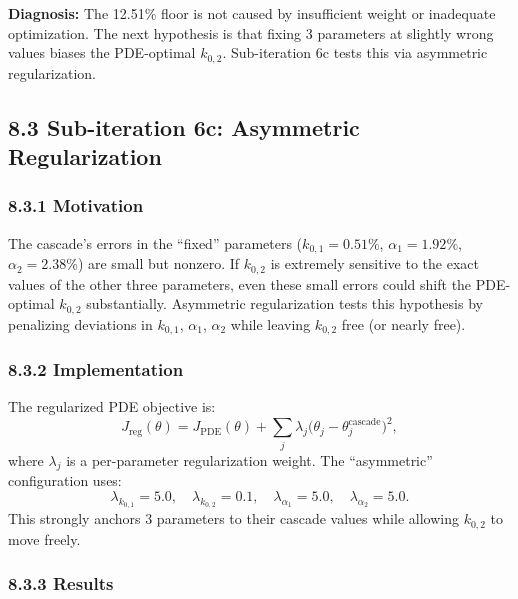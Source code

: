 \documentclass[11pt]{article}
\begin{document}
\textbf{Diagnosis:} The 12.51\% floor is not caused by insufficient weight
or inadequate optimization.  The next hypothesis is that fixing 3 parameters
at slightly wrong values biases the PDE-optimal $k_{0,2}$.  Sub-iteration
6c tests this via asymmetric regularization.

\subsection*{8.3 Sub-iteration 6c: Asymmetric Regularization}

\subsubsection*{8.3.1 Motivation}

The cascade's errors in the ``fixed'' parameters ($k_{0,1} = 0.51\%$,
$\alpha_1 = 1.92\%$, $\alpha_2 = 2.38\%$) are small but nonzero.
If $k_{0,2}$ is extremely sensitive to the exact values of the other three
parameters, even these small errors could shift the PDE-optimal $k_{0,2}$
substantially.  Asymmetric regularization tests this hypothesis by
penalizing deviations in $k_{0,1}$, $\alpha_1$, $\alpha_2$ while leaving
$k_{0,2}$ free (or nearly free).

\subsubsection*{8.3.2 Implementation}

The regularized PDE objective is:
\begin{equation}
  J_{\text{reg}}(\theta) = J_{\text{PDE}}(\theta) +
  \sum_{j} \lambda_j \bigl(\theta_j - \theta_j^{\text{cascade}}\bigr)^2,
\end{equation}
where $\lambda_j$ is a per-parameter regularization weight.  The
``asymmetric'' configuration uses:
\[
  \lambda_{k_{0,1}} = 5.0, \quad
  \lambda_{k_{0,2}} = 0.1, \quad
  \lambda_{\alpha_1} = 5.0, \quad
  \lambda_{\alpha_2} = 5.0.
\]
This strongly anchors 3 parameters to their cascade values while allowing
$k_{0,2}$ to move freely.

\subsubsection*{8.3.3 Results}
\end{document}
